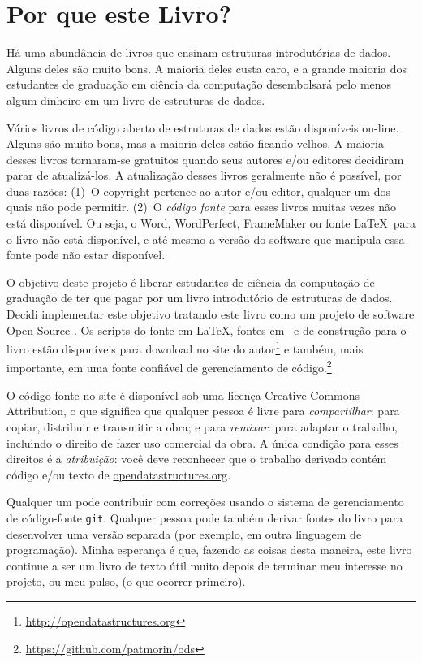 \chapter*{Por que este Livro?}

Há uma abundância de livros que ensinam estruturas introdutórias de dados.
Alguns deles são muito bons. A maioria deles custa caro, e a grande 
maioria dos estudantes de graduação em ciência da computação 
desembolsará pelo menos algum dinheiro em um livro de estruturas 
de dados.

Vários livros de código aberto de estruturas de dados estão disponíveis on-line. Alguns são muito bons, mas a maioria deles estão ficando velhos. A maioria desses livros tornaram-se gratuitos quando seus autores e/ou editores decidiram parar de atualizá-los. A atualização desses livros geralmente não é possível, por duas razões: (1)~O copyright pertence ao autor e/ou editor, qualquer um dos quais não pode permitir. (2)~O \emph{código fonte} para esses livros muitas vezes não está disponível. Ou seja, o Word, WordPerfect, FrameMaker ou fonte \LaTeX\ para o livro não está disponível, e até mesmo a versão do software que manipula essa fonte pode não estar disponível.

O objetivo deste projeto é liberar estudantes de ciência da computação de graduação de ter que pagar por um livro introdutório de estruturas de dados.
Decidi implementar este objetivo tratando este livro como um projeto de software Open Source
. 
Os scripts do fonte em \LaTeX, fontes em \lang\ e de construção para o livro estão disponíveis para download no site do autor\footnote{\url{http://opendatastructures.org}} e também, mais importante, em uma fonte confiável de gerenciamento de código.\footnote{\url{https://github.com/patmorin/ods}}

O código-fonte no site é disponível sob uma licença Creative Commons Attribution, o que significa que qualquer pessoa é livre para \emph{compartilhar}:
 para copiar, distribuir e transmitir a obra; e para \emph{remixar}:
para adaptar o trabalho, incluindo o direito de fazer uso comercial da obra. A única condição para esses direitos é a \emph{atribuição}: você deve reconhecer que o trabalho derivado contém código e/ou texto de \url{opendatastructures.org}.

Qualquer um pode contribuir com correções usando o sistema de gerenciamento de código-fonte \texttt{git}.
Qualquer pessoa pode também derivar fontes do livro para desenvolver uma versão separada (por exemplo, em outra linguagem de programação).
Minha esperança é que, fazendo as coisas desta maneira, este livro continue a ser um livro de texto útil muito depois de terminar meu interesse no projeto, ou meu pulso,
(o que ocorrer primeiro).



